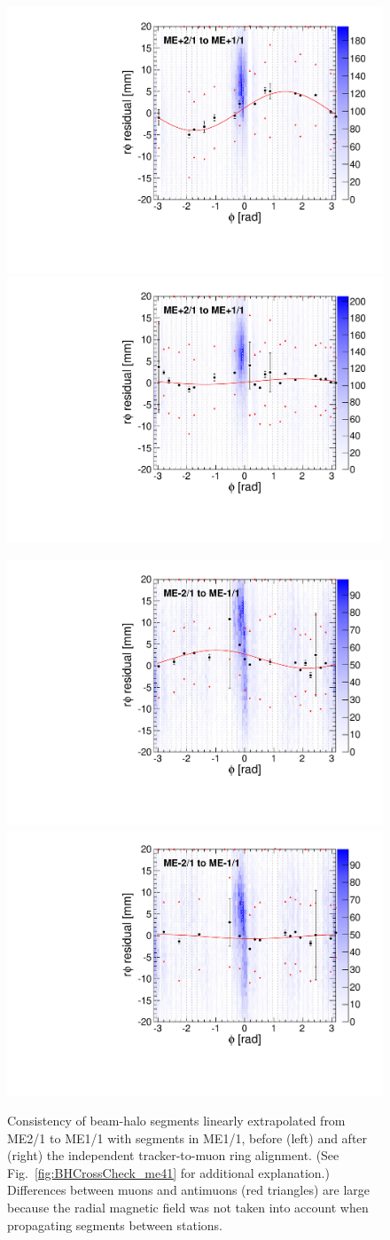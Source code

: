 \documentclass[12pt]{article}
\begin{document}
\begin{figure}
\begin{center}
\includegraphics[width=0.4\linewidth]{BHCrossCheck_mep11_before.pdf}
\includegraphics[width=0.4\linewidth]{BHCrossCheck_mep11_after.pdf}

\includegraphics[width=0.4\linewidth]{BHCrossCheck_mem11_before.pdf}
\includegraphics[width=0.4\linewidth]{BHCrossCheck_mem11_after.pdf}
\end{center}

\caption{Consistency of beam-halo segments linearly extrapolated from
  ME2/1 to ME1/1 with segments in ME1/1, before (left) and after
  (right) the independent tracker-to-muon ring alignment.  (See
  Fig.~\ref{fig:BHCrossCheck_me41} for additional explanation.)
  Differences between muons and antimuons (red triangles) are large
  because the radial magnetic field was not taken into account when
  propagating segments between stations. \label{fig:BHCrossCheck_me11}}
\end{figure}
\end{document}
